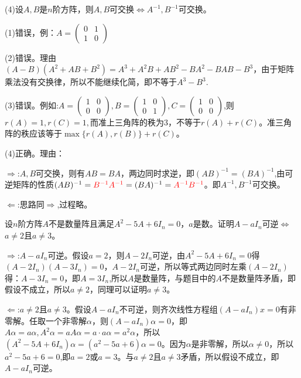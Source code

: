\documentclass[a4paper]{report}
\begin{document}
(4)设$A,B$是$n$阶方阵，则$A,B$可交换$\Leftrightarrow A^{-1},B^{-1}$可交换。

\begin{jie}
(1)错误，例：$A=
\begin{pmatrix}
0&1 \\ 1&0
\end{pmatrix}
$

(2)错误。理由$(A-B)(A^2+AB+B^2)=A^3+A^2B+AB^2-BA^{2}-BAB-B^3$，由于矩阵乘法没有交换律，所以不能继续化简，即不等于$A^3-B^3$.

(3)错误。例如:$A=
\begin{pmatrix}
1&0\\0&0
\end{pmatrix},B=
\begin{pmatrix}
1&0\\0&1
\end{pmatrix},C=
\begin{pmatrix}
1&0\\0&0
\end{pmatrix}
$,则$r(A)=1,r(C)=1,$而准上三角阵的秩为3，不等于$r(A)+r(C)$。准三角阵的秩应该等于$\max\{r(A),r(B)\}+r(C)$。

(4)正确。理由：

$\Rightarrow$:$A,B$可交换，则有$AB=BA$，两边同时求逆，即$(AB)^{-1}=(BA)^{-1}$,由可逆矩阵的性质$(AB)^{-1}=\textcolor[rgb]{1.00,0.00,0.00}{B^{-1}A^{-1}}=(BA)^{-1}=\textcolor[rgb]{1.00,0.00,0.00}{A^{-1}B^{-1}}$。即$A^{-1},B^{-1}$可交换。

$\Leftarrow$:思路同$\Rightarrow$,过程略。
\end{jie}

\EX 设$n$阶方阵$A$不是数量阵且满足$A^2-5A+6I_n=0$，$a$是数。证明$A-aI_n$可逆$\Leftrightarrow$ $a\neq 2$且$a\neq3$。

\begin{zhengming}
$\Rightarrow$:$A-aI_n$可逆。假设$a=2$，则$A-2I_n$可逆，由$A^2-5A+6I_n=0$得$(A-2I_n)(A-3I_{n})=0$，$A-2I_n$可逆，所以等式两边同时左乘$(A-2I_n)$得：$A-3I_{n}=0$，即$A=3I_{n}$,所以$A$是数量阵，与题目中的$A$不是数量阵矛盾，即假设不成立，所以$a\neq 2$，同理可以证明$a\neq 3$。

$\Leftarrow$:$a\neq 2$且$a\neq3$。假设$A-aI_n$不可逆，则齐次线性方程组$(A-aI_n)x=0$有非零解。任取一个非零解$\alpha$，则$(A-aI_n)\alpha=0$，即$A\alpha=a\alpha,A^2\alpha=aA\alpha=a\cdot a\alpha=a^2\alpha$，所以$(A^2-5A+6I_{n})\alpha=(a^2-5a+6)\alpha=0$。因为$\alpha$是非零解，所以$\alpha\neq 0$，所以$a^2-5a+6=0$,即$a=2$或$a=3$。与$a\neq 2$且$a\neq 3$矛盾，所以假设不成立，即$A-aI_n$可逆。
\end{zhengming}
\end{document}
